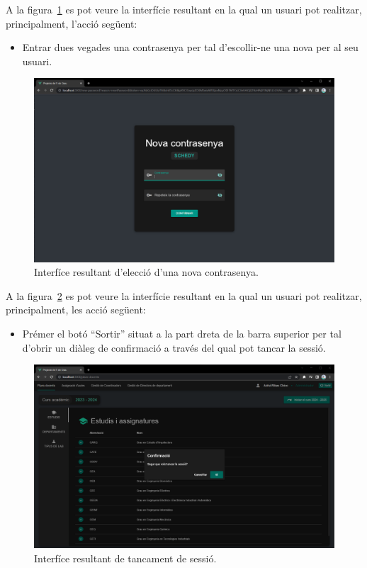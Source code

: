 \documentclass[a4paper,12pt]{ThesisStyle}
\begin{document}
\newpage

A la figura~\ref{img:resultats_auth_novaContrasenya} es pot veure la interfície resultant en la qual un usuari pot realitzar, principalment, l'acció següent:
\begin{itemize}
  \item Entrar dues vegades una contrasenya per tal d'escollir-ne una nova per al seu usuari.
\end{itemize}

\begin{figure}[H]
  \centering
  \includegraphics[width=\textwidth]{assets/results/auth/novaContrasenya.png}
  \caption{\label{img:resultats_auth_novaContrasenya}Interfíce resultant d'elecció d'una nova contrasenya.}
\end{figure}

\newpage

A la figura~\ref{img:resultats_auth_logout} es pot veure la interfície resultant en la qual un usuari pot realitzar, principalment, les acció següent:
\begin{itemize}
  \item Prémer el botó ``Sortir'' situat a la part dreta de la barra superior per tal d'obrir un diàleg de confirmació a través del qual pot tancar la sessió.
\end{itemize}

\begin{figure}[H]
  \centering
  \includegraphics[width=\textwidth]{assets/results/auth/logout.png}
  \caption{\label{img:resultats_auth_logout}Interfíce resultant de tancament de sessió.}
\end{figure}
\end{document}

